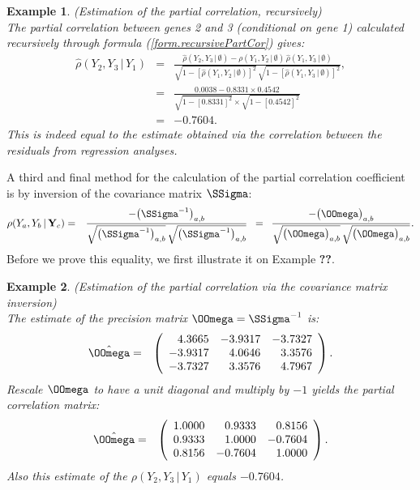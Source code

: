 \documentclass[a4paper]{article}
\theoremstyle{myexamplestyle}
\newtheorem{example}{Example}
\def\reminder#1{\marginpar{\rule[0pt]{1mm}{11pt}}\textbf{#1}}
\begin{document}
\begin{example} \textit{(Estimation of the partial correlation, recursively)}
\\
The partial correlation between genes 2 and 3 (conditional on gene 1) calculated recursively through formula (\ref{form.recursivePartCor}) gives: 
\begin{eqnarray*}
\hat{\rho} (Y_2, Y_3 \, | \, Y_1) 
& = & \frac{ \hat{\rho} (Y_2, Y_3 \, | \, \emptyset )
- \rho ( Y_1, Y_2 \, | \, \emptyset  )   \, \hat{\rho} (Y_1, Y_3 \, | \, \emptyset)
}{ 
\sqrt{ 1 - [\hat{\rho} ( Y_1, Y_2 \, | \, \emptyset )]^2 } \, \sqrt{ 1 - [\hat{\rho} ( Y_1, Y_3 \, | \, \emptyset )]^2 } 
} ,
\\
& = & \frac{ 0.0038 - 0.8331 \times  0.4542
}{ \sqrt{ 1 - [0.8331]^2 } \times \sqrt{ 1 - [ 0.4542]^2 } } 
\\
& = & -0.7604.
\end{eqnarray*}
This is indeed equal to the estimate obtained via the correlation between the residuals from regression analyses.
\end{example}


A third and final method for the calculation of the partial correlation coefficient is by inversion of the covariance matrix $\SSigma$:
\begin{eqnarray} \label{form.invCov2PartCor}
\rho (Y_a,  Y_b \, | \, \mathbf{Y}_c) & = & \frac{ - \big( \SSigma^{-1} \big)_{a, b}}{\sqrt{ \big( \SSigma^{-1} \big)_{a, b} } \, \sqrt{ \big( \SSigma^{-1} \big)_{a, b} }}
\, \, \, = \, \, \, 
\frac{ - \big( \OOmega \big)_{a, b}}{\sqrt{ \big( \OOmega \big)_{a, b} } \, \sqrt{ \big( \OOmega \big)_{a, b} }}.
\end{eqnarray}
Before we prove this equality, we first illustrate it on Example \reminder{??}.

\begin{example} \textit{(Estimation of the partial correlation via the covariance matrix inversion)}
\\
The estimate of the precision matrix $ \OOmega = \SSigma^{-1}$ is:
\begin{eqnarray*}
\hat{\OOmega} & = & 
\left(
\begin{array}{rrr}
 4.3665 & -3.9317 & -3.7327
\\
-3.9317 &  4.0646 &  3.3576
\\
-3.7327 &  3.3576 &  4.7967
\end{array}
\right).
\end{eqnarray*}
Rescale $ \OOmega$ to have a unit diagonal and multiply by $-1$ yields the partial correlation matrix:
\begin{eqnarray*}
\hat{\OOmega} & = & 
\left(
\begin{array}{rrr}
 1.0000 &  0.9333 &  0.8156
\\ 
 0.9333 & 1.0000 & -0.7604
\\
 0.8156 & -0.7604 &  1.0000
\end{array}
\right).
\end{eqnarray*}
Also this estimate of the $ \rho(Y_2, Y_3 \, | \, Y_1)$ equals $-0.7604$.
\end{example}
\end{document}
